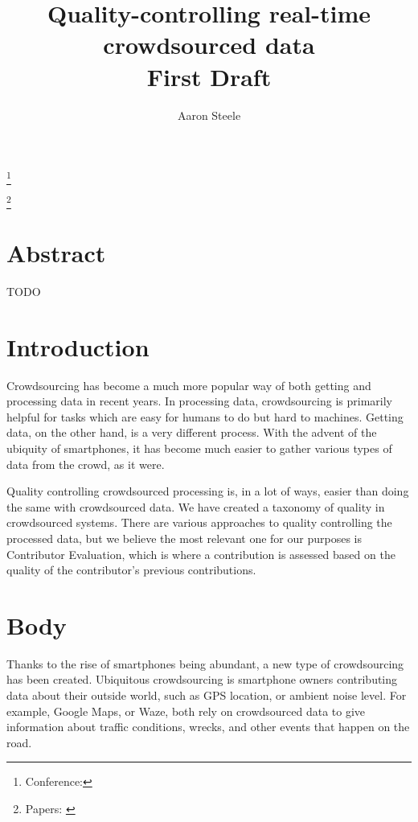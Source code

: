 \documentclass[12pt,twocolumn]{article}
\title{Quality-controlling real-time crowdsourced data \\ \large First Draft}
\author{Aaron Steele}
\date{}
\newcommand\blfootnote[1]{%
	\begingroup
	\renewcommand\thefootnote{}\footnote{#1}%
	\addtocounter{footnote}{-1}%
	\endgroup
}
\begin{document}
	\maketitle
	
	\blfootnote{Conference: }
	\blfootnote{Papers: \cite{UB-QC-CC}\cite{QC-CC}}
	
	
	\section*{Abstract}
	    TODO
	\section*{Introduction}
	    Crowdsourcing has become a much more popular way of both getting and processing data in recent years. In processing data, crowdsourcing is primarily helpful for tasks which are easy for humans to do but hard to machines. %
	    Getting data, on the other hand, is a very different process. With the advent of the ubiquity of smartphones, it has become much easier to gather various types of data from the crowd, as it were.
	    
	    Quality controlling crowdsourced processing is, in a lot of ways, easier than doing the same with crowdsourced data. We have created a taxonomy of quality in crowdsourced systems. There are various approaches to quality controlling the processed data, but we believe the most relevant one for our purposes is Contributor Evaluation, which is where a contribution is assessed based on the quality of the contributor's previous contributions. 
	    
	\section*{Body}
	    Thanks to the rise of smartphones being abundant, a new type of crowdsourcing has been created. Ubiquitous crowdsourcing is smartphone owners contributing data about their outside world, such as GPS location, or ambient noise level. For example, Google Maps, or Waze, both rely on crowdsourced data to give information about traffic conditions, wrecks, and other events that happen on the road. 
	    
\end{document}
